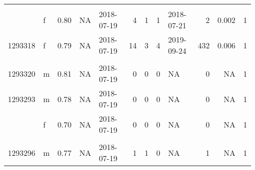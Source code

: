 \documentclass[
  authoryear,
  review,
  3p]{elsarticle}
\begin{document}
\begin{table}[H]
\begin{tabular}{llrrlrrrlrrr}
\cellcolor[HTML]{E2E2E2}{\textcolor{black}{1293322}} & \cellcolor[HTML]{E2E2E2}{\textcolor{black}{f}} & \cellcolor[HTML]{E2E2E2}{\textcolor{black}{0.80}} & \cellcolor[HTML]{E2E2E2}{\textcolor{black}{NA}} & \cellcolor[HTML]{E2E2E2}{\textcolor{black}{2018-07-19}} & \cellcolor[HTML]{E2E2E2}{\textcolor{black}{0}} & \cellcolor[HTML]{E2E2E2}{\textcolor{black}{0}} & \cellcolor[HTML]{E2E2E2}{\textcolor{black}{0}} & \cellcolor[HTML]{E2E2E2}{\textcolor{black}{NA}} & \cellcolor[HTML]{E2E2E2}{\textcolor{black}{19}} & \cellcolor[HTML]{E2E2E2}{\textcolor{black}{NA}} & \cellcolor[HTML]{E2E2E2}{\textcolor{black}{1}}\\
\addlinespace
1293317 & f & 0.80 & NA & 2018-07-19 & 4 & 1 & 1 & 2018-07-21 & 2 & 0.002 & 1\\
1293318 & f & 0.79 & NA & 2018-07-19 & 14 & 3 & 4 & 2019-09-24 & 432 & 0.006 & 1\\
\cellcolor[HTML]{E2E2E2}{\textcolor{black}{1293319}} & \cellcolor[HTML]{E2E2E2}{\textcolor{black}{f}} & \cellcolor[HTML]{E2E2E2}{\textcolor{black}{0.73}} & \cellcolor[HTML]{E2E2E2}{\textcolor{black}{NA}} & \cellcolor[HTML]{E2E2E2}{\textcolor{black}{2018-07-19}} & \cellcolor[HTML]{E2E2E2}{\textcolor{black}{7}} & \cellcolor[HTML]{E2E2E2}{\textcolor{black}{1}} & \cellcolor[HTML]{E2E2E2}{\textcolor{black}{1}} & \cellcolor[HTML]{E2E2E2}{\textcolor{black}{2018-08-01}} & \cellcolor[HTML]{E2E2E2}{\textcolor{black}{19}} & \cellcolor[HTML]{E2E2E2}{\textcolor{black}{0.002}} & \cellcolor[HTML]{E2E2E2}{\textcolor{black}{1}}\\
1293320 & m & 0.81 & NA & 2018-07-19 & 0 & 0 & 0 & NA & 0 & NA & 1\\
1293293 & m & 0.78 & NA & 2018-07-19 & 0 & 0 & 0 & NA & 0 & NA & 1\\
\addlinespace
1293294 & f & 0.70 & NA & 2018-07-19 & 0 & 0 & 0 & NA & 0 & NA & 1\\
\cellcolor[HTML]{E2E2E2}{\textcolor{black}{1293295}} & \cellcolor[HTML]{E2E2E2}{\textcolor{black}{m}} & \cellcolor[HTML]{E2E2E2}{\textcolor{black}{0.78}} & \cellcolor[HTML]{E2E2E2}{\textcolor{black}{NA}} & \cellcolor[HTML]{E2E2E2}{\textcolor{black}{2018-07-19}} & \cellcolor[HTML]{E2E2E2}{\textcolor{black}{21}} & \cellcolor[HTML]{E2E2E2}{\textcolor{black}{2}} & \cellcolor[HTML]{E2E2E2}{\textcolor{black}{5}} & \cellcolor[HTML]{E2E2E2}{\textcolor{black}{2018-08-19}} & \cellcolor[HTML]{E2E2E2}{\textcolor{black}{31}} & \cellcolor[HTML]{E2E2E2}{\textcolor{black}{0.004}} & \cellcolor[HTML]{E2E2E2}{\textcolor{black}{1}}\\
1293296 & m & 0.77 & NA & 2018-07-19 & 1 & 1 & 0 & NA & 1 & NA & 1\\

\end{tabular}
\end{table}
\end{document}
